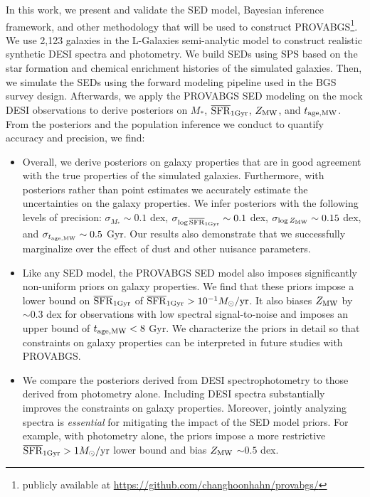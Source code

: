 In this work, we present and validate the SED model, Bayesian inference
framework, and other methodology that will be used to construct
PROVABGS\footnote{publicly available at
\href{https://github.com/changhoonhahn/provabgs/}{https://github.com/changhoonhahn/provabgs/}}.
We use 2,123 galaxies in the {\sc L-Galaxies} semi-analytic model to construct
realistic synthetic DESI spectra and photometry.  
We build SEDs using SPS based on the star formation and chemical enrichment
histories of the simulated galaxies.
Then, we simulate the SEDs using the forward modeling pipeline used in the BGS
survey design.  
Afterwards, we apply the PROVABGS SED modeling on the mock DESI observations to
derive posteriors on $M_*$, $\overline{\rm SFR}_{\rm 1Gyr}$, $Z_{\rm MW}$, and $t_{\rm age, MW}$. 
From the posteriors and the population inference we conduct to quantify
accuracy and precision, we find: 
\begin{itemize}
    \item Overall, we derive posteriors on galaxy properties that are in good
        agreement with the true properties of the simulated galaxies. 
        Furthermore, with posteriors rather than point estimates we accurately
        estimate the uncertainties on the galaxy properties. 
        We infer posteriors with the following levels of precision: 
        $\sigma_{M_*}\sim0.1$ dex, $\sigma_{\log\overline{\rm SFR}_{\rm 1Gyr}}\sim0.1$ dex, 
        $\sigma_{\log Z_{\rm MW}}\sim0.15$ dex, and $\sigma_{t_{\rm age, MW}}\sim0.5$ Gyr. 
        Our results also demonstrate that we successfully marginalize over the
        effect of dust and other nuisance parameters. 
    \item Like any SED model, the PROVABGS SED model also imposes significantly
        non-uniform priors on galaxy properties. 
        We find that these priors impose a lower bound on $\overline{\rm SFR}_{\rm 1Gyr}$ of 
        $\overline{\rm SFR}_{\rm 1Gyr} > 10^{-1}M_\odot/{\rm yr}$. 
        It also biases $Z_{\rm MW}$ by ${\sim}0.3$ dex for observations with low
        spectral signal-to-noise and imposes an upper bound of $t_{\rm age, MW} < 8$ Gyr. 
        We characterize the priors in detail so that constraints on galaxy
        properties can be interpreted in future studies with PROVABGS.
    \item We compare the posteriors derived from DESI spectrophotometry to
        those derived from photometry alone. 
        Including DESI spectra substantially improves the constraints on galaxy
        properties. 
        Moreover, jointly analyzing spectra is {\em essential} for mitigating
        the impact of the SED model priors. 
        For example, with photometry alone, the priors impose a more
        restrictive $\overline{\rm SFR}_{\rm 1Gyr} > 1 M_\odot/{\rm yr}$ lower bound and bias $Z_{\rm MW}$
        ${\sim}0.5$ dex.
\end{itemize}

